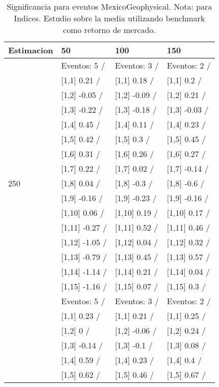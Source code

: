 \begin{table}

\caption{Significancia para eventos MexicoGeophysical. Nota: para Indices. Estudio sobre la media utilizando benchmark como retorno de mercado.}
\centering
\begin{tabular}[t]{llll}
\toprule
Estimacion & 50 & 100 & 150\\
\midrule
 & Eventos:  5 / & Eventos:  3 / & Eventos:  2 /\\
 & {}[1,1] 0.21  / & {}[1,1] 0.18  / & {}[1,1] 0.2  /\\
 & {}[1,2] -0.05  / & {}[1,2] -0.09  / & {}[1,2] 0.21  /\\
 & {}[1,3] -0.22  / & {}[1,3] -0.18  / & {}[1,3] -0.03  /\\
 & {}[1,4] 0.45  / & {}[1,4] 0.11  / & {}[1,4] 0.23  /\\
\addlinespace
 & {}[1,5] 0.42  / & {}[1,5] 0.3  / & {}[1,5] 0.45  /\\
 & {}[1,6] 0.31  / & {}[1,6] 0.26  / & {}[1,6] 0.27  /\\
 & {}[1,7] 0.22  / & {}[1,7] 0.02  / & {}[1,7] -0.14  /\\
250 & {}[1,8] 0.04  / & {}[1,8] -0.3  / & {}[1,8] -0.6  /\\
 & {}[1,9] -0.16  / & {}[1,9] -0.23  / & {}[1,9] -0.16  /\\
\addlinespace
 & {}[1,10] 0.06  / & {}[1,10] 0.19  / & {}[1,10] 0.17  /\\
 & {}[1,11] -0.27  / & {}[1,11] 0.52  / & {}[1,11] 0.46  /\\
 & {}[1,12] -1.05  / & {}[1,12] 0.04  / & {}[1,12] 0.32  /\\
 & {}[1,13] -0.79  / & {}[1,13] 0.45  / & {}[1,13] 0.57  /\\
 & {}[1,14] -1.14  / & {}[1,14] 0.21  / & {}[1,14] 0.04  /\\
\addlinespace
 & {}[1,15] -1.16  / & {}[1,15] 0.07  / & {}[1,15] 0.3  /\\
 & Eventos:  5 / & Eventos:  3 / & Eventos:  2 /\\
 & {}[1,1] 0.23  / & {}[1,1] 0.21  / & {}[1,1] 0.25  /\\
 & {}[1,2] 0  / & {}[1,2] -0.06  / & {}[1,2] 0.24  /\\
 & {}[1,3] -0.14  / & {}[1,3] -0.1  / & {}[1,3] 0.08  /\\
\addlinespace
 & {}[1,4] 0.59  / & {}[1,4] 0.23  / & {}[1,4] 0.4  /\\
 & {}[1,5] 0.62  / & {}[1,5] 0.46  / & {}[1,5] 0.67  /\\

\end{tabular}
\end{table}
